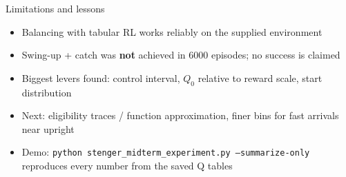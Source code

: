 \documentclass[aspectratio=169,10pt]{beamer}
\begin{document}
\begin{frame}{Limitations and lessons}
\begin{itemize}
\item Balancing with tabular RL works reliably on the supplied environment
\item Swing-up + catch was \textbf{not} achieved in 6000 episodes; no success is claimed
\item Biggest levers found: control interval, $Q_0$ relative to reward scale, start distribution
\item Next: eligibility traces / function approximation, finer bins for fast arrivals near upright
\item Demo: \texttt{python stenger\_midterm\_experiment.py --summarize-only} reproduces every number from the saved Q tables
\end{itemize}
\end{frame}
\end{document}
